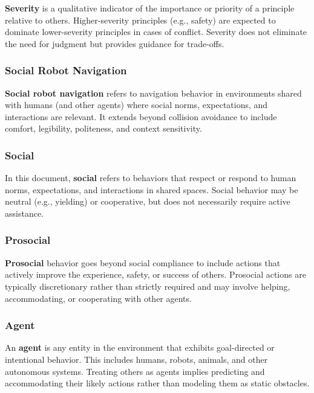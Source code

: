 \documentclass[utf8]{frontiers_suppmat} %
\begin{document}
\textbf{Severity} is a qualitative indicator of the importance or
priority of a principle relative to others. Higher-severity principles
(e.g., safety) are expected to dominate lower-severity principles in
cases of conflict. Severity does not eliminate the need for judgment but
provides guidance for trade-offs.

\subsubsection{Social Robot Navigation}\label{social-robot-navigation}

\textbf{Social robot navigation} refers to navigation behavior in
environments shared with humans (and other agents) where social norms,
expectations, and interactions are relevant. It extends beyond collision
avoidance to include comfort, legibility, politeness, and context
sensitivity.

\subsubsection{Social}\label{social}

In this document, \textbf{social} refers to behaviors that respect or
respond to human norms, expectations, and interactions in shared spaces.
Social behavior may be neutral (e.g., yielding) or cooperative, but does
not necessarily require active assistance.

\subsubsection{Prosocial}\label{prosocial}

\textbf{Prosocial} behavior goes beyond social compliance to include
actions that actively improve the experience, safety, or success of
others. Prosocial actions are typically discretionary rather than
strictly required and may involve helping, accommodating, or cooperating
with other agents.

\subsubsection{Agent}\label{agent}

An \textbf{agent} is any entity in the environment that exhibits
goal-directed or intentional behavior. This includes humans, robots,
animals, and other autonomous systems. Treating others as agents implies
predicting and accommodating their likely actions rather than modeling
them as static obstacles.
\end{document}
